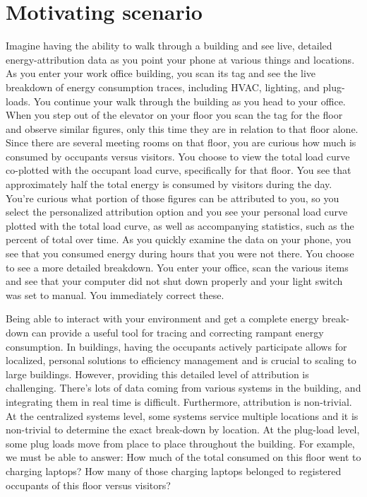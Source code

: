 \section{Motivating scenario}
\label{sec:vision}


Imagine having the ability to walk through a building and see live, detailed energy-attribution data as
you point your phone at various things and locations.  As you enter your work office building, you scan its tag and see
the live breakdown of energy consumption traces, including HVAC, lighting, and plug-loads.  You continue
your walk through the building as you head to your office.  When you step out of the elevator on your floor
you scan the tag for the floor and observe similar figures, only this time they are in relation to that floor
alone.  Since there are several meeting rooms on that floor, you are curious how much is consumed by 
occupants versus visitors.  You choose to view the total load curve co-plotted with the occupant
load curve, specifically for that floor.  You see that approximately half the total energy is consumed
by visitors during the day.  You're curious what portion of those figures can be attributed to you, so you select the 
personalized attribution option and you see your personal load curve plotted
with the total load curve, as well as accompanying statistics, such as the percent of total over time.
As you quickly examine the data on your phone, you see that you consumed energy during hours that you were not
there.  You choose to see a more detailed breakdown.  You enter your office, scan the various items and see that
your computer did not shut down properly and your light switch was set to manual.  You immediately 
correct these.

Being able to interact with your environment and get a complete energy break-down can provide a useful tool
for tracing and correcting rampant energy consumption.  In buildings, having the occupants actively participate
allows for localized, personal solutions to efficiency management and is crucial to scaling to large buildings.
However, providing this detailed level of attribution is challenging.  There's lots of data coming from various systems 
in the building, and integrating them in real time is difficult.  Furthermore, attribution is non-trivial.  At the
centralized systems level, some systems service multiple locations and it is non-trivial to determine the exact
break-down by location.  At the plug-load level, some plug loads move from place to place throughout the building.
For example, we must be able to answer: How much of the total consumed on this floor went to charging laptops?  How
many of those charging laptops belonged to registered occupants of this floor versus visitors?

